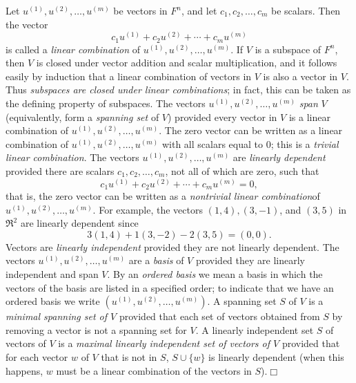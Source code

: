 \begin{definition}\label{1def:linearcomb}{\rm
Let $u^{(1)},u^{(2)},\ldots,u^{(m)}$ be vectors in $F^n$, and let 
$c_1,c_2,\ldots,c_m$ be scalars. Then the vector
\[c_1u^{(1)}+c_2u^{(2)}+\cdots+c_mu^{(m)}\]
is called a {\it linear combination}  of $u^{(1)},u^{(2)},\ldots,u^{(m)}$.
If $V$ is a subspace of $F^n$, then $V$ is closed under vector addition and 
scalar multiplication, and it follows easily by induction that a 
linear combination of vectors in $V$ is also a vector in $V$. Thus 
{\it subspaces 
are closed under linear combinations}; in fact, this can be taken as the 
defining property of subspaces.
The vectors $u^{(1)},u^{(2)},\ldots,u^{(m)}$ {\it span} $V$ 
(equivalently, form a {\it spanning set} of $V$) provided every vector in 
$V$ 
is a linear combination of $u^{(1)},u^{(2)},\ldots,u^{(m)}$. The zero 
vector can be written as a linear combination of 
$u^{(1)},u^{(2)},\ldots,u^{(m)}$ with all scalars equal to 0; this is a 
{\it trivial linear combination}. The vectors
$u^{(1)},u^{(2)},\ldots,u^{(m)}$ are {\it linearly dependent} provided 
there are scalars $c_1,c_2,\ldots,c_m$, not all of which are zero, such 
that
\[c_1u^{(1)}+c_2u^{(2)}+\cdots+c_mu^{(m)}=0,\]
that is, the zero vector can be written as a {\it nontrivial linear  
combination}\break of $u^{(1)},u^{(2)},\ldots,u^{(m)}$.
For example, the vectors $(1,4), (3,-1)$, and $(3,5)$ in $\Re^2$ are 
linearly 
dependent since
\[3(1,4)+1(3,-2)-2(3,5)=(0,0).\] Vectors are {\it linearly independent} provided  they are not linearly dependent.
The vectors 
$u^{(1)},u^{(2)},\ldots,u^{(m)}$ are a {\it basis}  of $V$ provided they are  
linearly independent and span $V$.
By an {\it ordered basis}  we mean a basis in which the vectors of the basis are listed 
in a specified order; to indicate that we have an ordered basis we write
$(u^{(1)},u^{(2)},\ldots,u^{(m)})$. 
A spanning set $S$ of $V$ is a  {\it minimal spanning set of $V$} provided that
each set 
of vectors obtained from $S$ by removing a vector is not a spanning set 
for $V$.
A linearly independent set $S$ of vectors of $V$ is a {\it maximal linearly 
independent set of vectors of $V$} provided that for each vector $w$ of 
$V$ that 
is not in $S$, $S\cup\{w\}$ is  linearly dependent (when this happens, 
$w$ must be  a linear combination of the vectors in 
$S$).\hfill{$\Box$}
}\end{definition}


